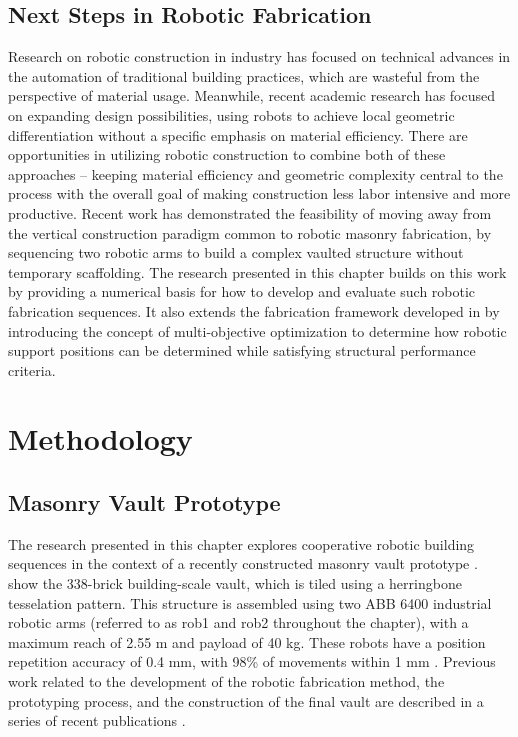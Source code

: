 \subsection{Next Steps in Robotic Fabrication}
Research on robotic construction in industry has focused on technical advances in the automation of traditional building practices, which are wasteful from the perspective of material usage. Meanwhile, recent academic research has focused on expanding design possibilities, using robots to achieve local geometric differentiation without a specific emphasis on material efficiency. There are opportunities in utilizing robotic construction to combine both of these approaches -- keeping material efficiency and geometric complexity central to the process with the overall goal of making construction less labor intensive and more productive. Recent work \cite{parascho_robotic_2020, parascho_lightvault_2021, han_concept_2020} has demonstrated the feasibility of moving away from the vertical construction paradigm common to robotic masonry fabrication, by sequencing two robotic arms to build a complex vaulted structure without temporary scaffolding. The research presented in this chapter builds on this work by providing a numerical basis for how to develop and evaluate such robotic fabrication sequences. It also extends the fabrication framework developed in \cite{parascho_robotic_2020, parascho_lightvault_2021, han_concept_2020} by introducing the concept of multi-objective optimization to determine how robotic support positions can be determined while satisfying structural performance criteria.




\section{Methodology}\label{mod_approach}

\subsection{Masonry Vault Prototype}\label{sec:2_prototype}
The research presented in this chapter explores cooperative robotic building sequences in the context of a recently constructed masonry vault prototype \cite{parascho_lightvault_2021}.  show the 338-brick building-scale vault, which is tiled using a herringbone tesselation pattern. This structure is assembled using two ABB 6400 industrial robotic arms (referred to as rob1 and rob2 throughout the chapter), with a maximum reach of 2.55 m and payload of 40 kg. These robots have a position repetition accuracy of 0.4 mm, with 98\% of movements within 1 mm \cite{abb_product_2020}. Previous work related to the development of the robotic fabrication method, the prototyping process, and the construction of the final vault are described in a series of recent publications \cite{han_concept_2020, parascho_robotic_2020, parascho_lightvault_2021}. 

